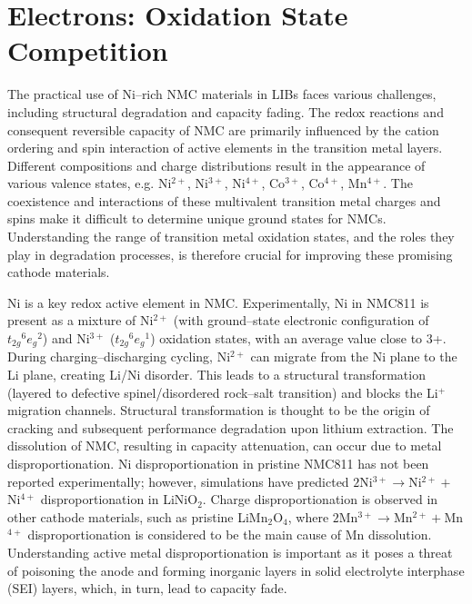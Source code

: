\documentclass[journal=jacsat,manuscript=article]{achemso}
\begin{document}
\section*{Electrons: Oxidation State Competition}
The practical use of Ni--rich NMC materials in LIBs faces various challenges, including structural degradation and capacity fading. 
The redox reactions and consequent reversible capacity of NMC are primarily influenced by the cation ordering and spin interaction of active elements in the transition metal layers.\cite{Li-acsami-2020,Sari2019,duan2019insights,Xia2018,Xiao_NanoEner2018} 
Different compositions and charge distributions result in the appearance of various valence states, e.g. Ni$^{2+}$, Ni$^{3+}$, Ni$^{4+}$, Co$^{3+}$, Co$^{4+}$, Mn$^{4+}$.\cite{Xiao_NanoEner2018} 
The coexistence and interactions of these multivalent transition metal charges and spins make it difficult to determine unique ground states for NMCs.\cite{Xiao_NanoEner2018}
Understanding the range of transition metal oxidation states, and the roles they play in degradation processes, is therefore crucial for improving these promising cathode materials.

Ni is a key redox active element in NMC.
Experimentally, Ni in NMC811 is present as a mixture of Ni$^{2+}$ (with ground--state electronic configuration of ${t_{2g}}^{6}{e_{g}}^{2}$) and Ni$^{3+}$ (${t_{2g}}^{6}{e_{g}}^{1}$) oxidation states, with an average value close to 3+.\cite{Zhu_JMatChemA2019,Katharina-chemmater,Kondrakov_JPhysChemC2017}
During charging--discharging cycling, Ni$^{2+}$ can migrate from the Ni plane to the Li plane, creating Li/Ni disorder.\cite{Zhang-acs.chemmater-2019,duan2019insights,Xia2018} 
This leads to a structural transformation (layered to defective spinel/disordered rock--salt transition) and blocks the Li$^{+}$  migration channels.\cite{Xia2018}
Structural transformation is thought to be the origin of cracking and subsequent performance degradation upon lithium extraction.\cite{Katharina-chemmater,Li-aenm-2019,Li2019degra}   
The dissolution of NMC, resulting in capacity attenuation, can occur due to metal disproportionation.\cite{buchberger2015} 
Ni disproportionation in pristine NMC811 has not been reported experimentally; however, simulations have predicted $2$Ni$^{3+}\rightarrow$Ni$^{2+} + $Ni$^{4+}$ disproportionation in LiNiO$_2$.\cite{HChen_PhysRevB2011} 
Charge disproportionation is observed in other cathode materials, such as pristine LiMn$_2$O$_4$, where $2$Mn$^{3+}\rightarrow$Mn$^{2+} + $Mn$^{4+}$ disproportionation is considered to be the main cause of Mn dissolution. 
Understanding active metal disproportionation is important as it poses a threat of poisoning the anode\cite{Parmar-LMO-2020,PASQUALINI2017} and forming inorganic layers in solid electrolyte interphase (SEI) layers,\cite{joshi2014} which, in turn, lead to capacity fade. 
\end{document}
